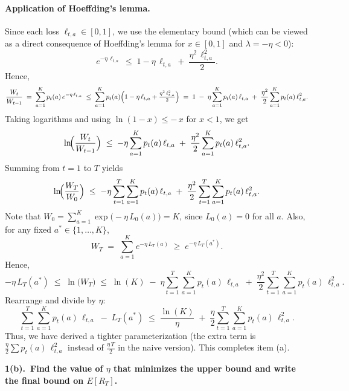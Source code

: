 \paragraph{Application of Hoeffding's lemma.}
Since each loss $\ell_{t,a}\in [0,1]$, we use the elementary bound (which can be viewed as a direct consequence of Hoeffding's lemma for $x\in[0,1]$ and $\lambda=-\eta<0$):
\[
e^{-\eta\,\ell_{t,a}} \;\le\; 1 - \eta\,\ell_{t,a} \;+\;\frac{\eta^2\,\ell_{t,a}^2}{2}.
\]
Hence,
\[
\frac{W_t}{W_{t-1}}
\;=\;\sum_{a=1}^K p_t(a)\,e^{-\eta\,\ell_{t,a}}
\;\le\;
\sum_{a=1}^K p_t(a)\Bigl(1 - \eta\,\ell_{t,a} + \tfrac{\eta^2\,\ell_{t,a}^2}{2}\Bigr)
\;=\;
1 \;-\;\eta\sum_{a=1}^K p_t(a)\,\ell_{t,a}
\;+\;\frac{\eta^2}{2}\sum_{a=1}^K p_t(a)\,\ell_{t,a}^2.
\]
Taking logarithms and using $\ln(1 - x)\le -\,x$ for $x<1$, we get
\[
\ln\!\Bigl(\frac{W_t}{W_{t-1}}\Bigr)
\;\le\;
-\eta\sum_{a=1}^K p_t(a)\,\ell_{t,a}
\;+\;\frac{\eta^2}{2}\sum_{a=1}^K p_t(a)\,\ell_{t,a}^2.
\]
Summing from $t=1$ to $T$ yields
\[
\ln\!\Bigl(\frac{W_T}{W_0}\Bigr)
\;\le\;
-\eta\sum_{t=1}^T \sum_{a=1}^K p_t(a)\,\ell_{t,a}
\;+\;\frac{\eta^2}{2}\sum_{t=1}^T \sum_{a=1}^K p_t(a)\,\ell_{t,a}^2.
\]
Note that $W_0 = \sum_{a=1}^K \exp\bigl(-\eta\,L_0(a)\bigr) = K$, since $L_0(a)=0$ for all $a$.  Also, for any fixed $a^*\in\{1,\dots,K\}$,
\[
W_T
\;=\;\sum_{a=1}^K e^{-\eta\,L_T(a)}
\;\ge\;
e^{-\eta\,L_T(a^*)}.
\]
Hence,
\[
-\eta\,L_T(a^*)
\;\le\;
\ln\!\bigl(W_T\bigr)
\;\le\;
\ln(K)
\;-\;\eta\sum_{t=1}^T \sum_{a=1}^K p_t(a)\,\ell_{t,a}
\;+\;\frac{\eta^2}{2}\sum_{t=1}^T \sum_{a=1}^K p_t(a)\,\ell_{t,a}^2.
\]
Rearrange and divide by $\eta$:
\[
\sum_{t=1}^T\sum_{a=1}^K p_t(a)\,\ell_{t,a}
\;-\;L_T(a^*)
\;\le\;
\frac{\ln(K)}{\eta}
\;+\;\frac{\eta}{2}\sum_{t=1}^T \sum_{a=1}^K p_t(a)\,\ell_{t,a}^2.
\]
Thus, we have derived a tighter parameterization (the extra term is $\frac{\eta}{2}\sum p_t(a)\,\ell_{t,a}^2$ instead of $\frac{\eta\,T}{2}$ in the naive version).  This completes item (a).

\bigskip

\noindent
\textbf{1(b).~Find the value of $\eta$ that minimizes the upper bound and write the final bound on $E[R_T]$.}

